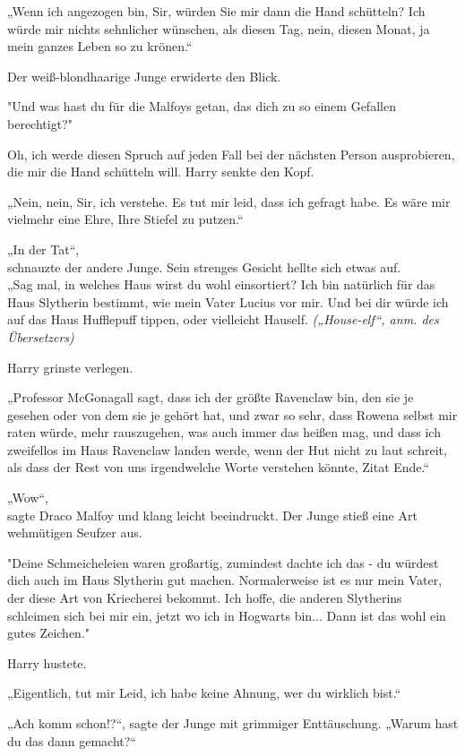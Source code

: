 {„Wenn ich angezogen bin, Sir, würden Sie mir dann die Hand schütteln? Ich würde mir nichts sehnlicher wünschen, als diesen Tag, nein, diesen Monat, ja mein ganzes Leben so zu krönen.“

Der weiß-blondhaarige Junge erwiderte den Blick.

"Und was hast du für die Malfoys getan, das dich zu so einem Gefallen berechtigt?"

Oh, ich werde diesen Spruch auf jeden Fall bei der nächsten Person ausprobieren, die mir die Hand schütteln will. Harry senkte den Kopf.

„Nein, nein, Sir, ich verstehe. Es tut mir leid, dass ich gefragt habe. Es wäre mir vielmehr eine Ehre, Ihre Stiefel zu putzen.“

„In der Tat“,\\ schnauzte der andere Junge. Sein strenges Gesicht hellte sich etwas auf.\\ „Sag mal, in welches Haus wirst du wohl einsortiert? Ich bin natürlich für das Haus Slytherin bestimmt, wie mein Vater Lucius vor mir. Und bei dir würde ich auf das Haus Hufflepuff tippen, oder vielleicht Hauself. \emph{(„House-elf“, anm. des Übersetzers)}

Harry grinste verlegen.

„Professor McGonagall sagt, dass ich der größte Ravenclaw bin, den sie je gesehen oder von dem sie je gehört hat, und zwar so sehr, dass Rowena selbst mir raten würde, mehr rauszugehen, was auch immer das heißen mag, und dass ich zweifellos im Haus Ravenclaw landen werde, wenn der Hut nicht zu laut schreit, als dass der Rest von uns irgendwelche Worte verstehen könnte, Zitat Ende.“

„Wow“,\\ sagte Draco Malfoy und klang leicht beeindruckt. Der Junge stieß eine Art wehmütigen Seufzer aus.

"Deine Schmeicheleien waren großartig, zumindest dachte ich das - du würdest dich auch im Haus Slytherin gut machen. Normalerweise ist es nur mein Vater, der diese Art von Kriecherei bekommt. Ich hoffe, die anderen Slytherins schleimen sich bei mir ein, jetzt wo ich in Hogwarts bin... Dann ist das wohl ein gutes Zeichen."

Harry hustete.

„Eigentlich, tut mir Leid, ich habe keine Ahnung, wer du wirklich bist.“

„Ach komm schon!?“, sagte der Junge mit grimmiger Enttäuschung. „Warum hast du das dann gemacht?“

}
